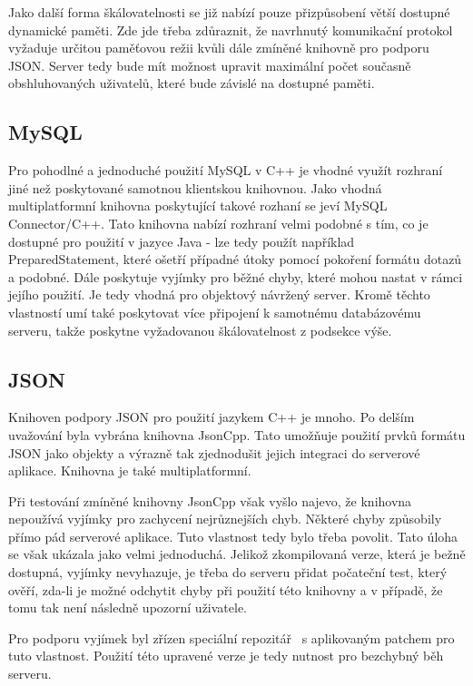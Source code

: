 \documentclass[thesis=B,czech]{FITthesis}[2013/10/20]
\begin{document}
Jako další forma škálovatelnosti se již nabízí pouze přizpůsobení větší dostupné dynamické paměti. Zde jde třeba zdůraznit, že navrhnutý komunikační protokol vyžaduje určitou paměťovou režii kvůli dále zmíněné knihovně pro podporu JSON. Server tedy bude mít možnost upravit maximální počet současně obshluhovaných uživatelů, které bude závislé na dostupné paměti.

\subsection{MySQL}

Pro pohodlné a jednoduché použití MySQL v C++ je vhodné využít rozhraní jiné než poskytované samotnou klientskou knihovnou. Jako vhodná multiplatformní knihovna poskytující takové rozhaní se jeví MySQL Connector/C++. Tato knihovna nabízí rozhraní velmi podobné s tím, co je dostupné pro použití v jazyce Java - lze tedy použít například PreparedStatement, které ošetří případné útoky pomocí pokoření formátu dotazů a podobné. Dále poskytuje vyjímky pro běžné chyby, které mohou nastat v rámci jejího použití. Je tedy vhodná pro objektový návržený server. Kromě těchto vlastností umí také poskytovat více připojení k samotnému databázovému serveru, takže poskytne vyžadovanou škálovatelnost z podsekce výše.

\subsection{JSON}

Knihoven podpory JSON pro použití jazykem C++ je mnoho. Po delším uvažování byla vybrána knihovna JsonCpp. Tato umožňuje použití prvků formátu JSON jako objekty a výrazně tak zjednodušit jejich integraci do serverové aplikace. Knihovna je také multiplatformní.

Při testování zmíněné knihovny JsonCpp však vyšlo najevo, že knihovna nepoužívá vyjímky pro zachycení nejrůznejších chyb. Některé chyby způsobily přímo pád serverové aplikace. Tuto vlastnost tedy bylo třeba povolit. Tato úloha se však ukázala jako velmi jednoduchá. Jelikož zkompilovaná verze, která je bežně dostupná, vyjímky nevyhazuje, je třeba do serveru přidat počateční test, který ověří, zda-li je možné odchytit chyby při použití této knihovny a v případě, že tomu tak není následně upozorní uživatele.

Pro podporu vyjímek byl zřízen speciální repozitář~\cite{json_ex_repo} s aplikovaným patchem pro tuto vlastnost. Použití této upravené verze je tedy nutnost pro bezchybný běh serveru.
\end{document}

